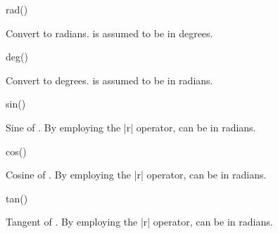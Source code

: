 \begin{math-function}{rad()}
\mathcommand

	Convert  to radians.  is assumed to be in degrees.
	
\begin{codeexample}[]
 \pgfmathresult
\end{codeexample}

\end{math-function}

\begin{math-function}{deg()}
\mathcommand

	Convert  to degrees.  is assumed to be in radians.
	
\begin{codeexample}[]
 \pgfmathresult
\end{codeexample}

\end{math-function}

\begin{math-function}{sin()}
\mathcommand

	Sine of . By employing the |r| operator,  can be in 
	radians.
	
\begin{codeexample}[]
 \pgfmathresult
\end{codeexample}

\begin{codeexample}[]
 \pgfmathresult
\end{codeexample}

\end{math-function}

\begin{math-function}{cos()}
\mathcommand

	Cosine of . By employing the |r| operator,  can be in 
	radians.

\begin{codeexample}[]
 \pgfmathresult
\end{codeexample}

\begin{codeexample}[]
 \pgfmathresult
\end{codeexample}

\end{math-function}

\begin{math-function}{tan()}
\mathcommand

	Tangent of . By employing the |r| operator,  can be in 
	radians.
	
\begin{codeexample}[]
 \pgfmathresult
\end{codeexample}

\begin{codeexample}[]
 \pgfmathresult
\end{codeexample}

\end{math-function}


